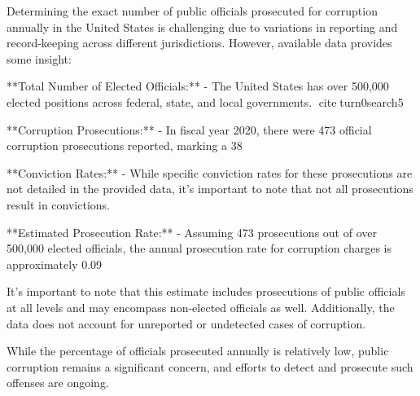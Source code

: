 Determining the exact number of public officials prosecuted for corruption annually in the United States is challenging due to variations in reporting and record-keeping across different jurisdictions. However, available data provides some insight:

**Total Number of Elected Officials:**
- The United States has over 500,000 elected positions across federal, state, and local governments. citeturn0search5

**Corruption Prosecutions:**
- In fiscal year 2020, there were 473 official corruption prosecutions reported, marking a 38%

**Conviction Rates:**
- While specific conviction rates for these prosecutions are not detailed in the provided data, it's important to note that not all prosecutions result in convictions.

**Estimated Prosecution Rate:**
- Assuming 473 prosecutions out of over 500,000 elected officials, the annual prosecution rate for corruption charges is approximately 0.09%

It's important to note that this estimate includes prosecutions of public officials at all levels and may encompass non-elected officials as well. Additionally, the data does not account for unreported or undetected cases of corruption.

While the percentage of officials prosecuted annually is relatively low, public corruption remains a significant concern, and efforts to detect and prosecute such offenses are ongoing.
